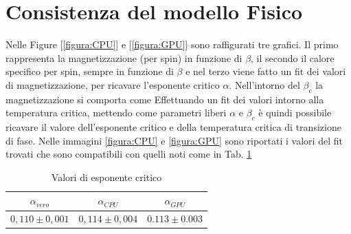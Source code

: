 \documentclass[a4paper,12pt]{article}
\begin{document}
\section{Consistenza del modello Fisico}
Nelle Figure [\ref{figura:CPU}] e [\ref{figura:GPU}] sono raffigurati tre grafici. Il primo rappresenta la magnetizzazione (per spin) in funzione di $\beta$, il secondo il calore specifico per spin, sempre in funzione di $\beta$ e nel terzo viene fatto un fit dei valori di magnetizzazione, per ricavare l'esponente critico $\alpha$. Nell'intorno del $\beta_c$ la magnetizzazione si comporta come
Effettuando un fit dei valori intorno alla temperatura critica, mettendo come parametri liberi $\alpha$ e $\beta_c$ è quindi possibile ricavare il valore dell'esponente critico e della temperatura critica di transizione di fase. Nelle immagini \ref{figura:CPU} e \ref{figura:GPU} sono riportati i valori del fit trovati che sono compatibili con quelli noti come in Tab. \ref{tab:espcr}


\begin{table}
	\begin{center}
		\begin{tabular}{c|c|c}
		\hline
		\hline
		$\alpha_{vero}$ & $\alpha_{CPU}$ & $\alpha_{GPU}$     \\
		\hline
		$0,110\pm0,001$ & $0,114\pm0,004$ & $0.113\pm0.003$ \\
		\hline
		\hline
		\end{tabular}
	\end{center}
	\caption{\label{tab:espcr} Valori di esponente critico  }
\end{table}
\end{document}
